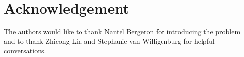 \documentclass[11pt]{amsart}
\numberwithin{equation}{section}
\newcommand{\bbmone}{{\mathbbm{1}}}
\newcommand{\frakS}{{\mathfrak{S}}}
\newcommand{\cf}{{\mathrm{cf}}}
\newcommand{\sgn}{{\mathrm{sgn}}}
\newcommand{\reg}{{\mathrm{reg}}}
\begin{document}
%
%





\section{Acknowledgement}
The authors would like to thank Nantel Bergeron for introducing the problem and to thank Zhicong Lin and Stephanie van Willigenburg for helpful conversations.

\end{document}
